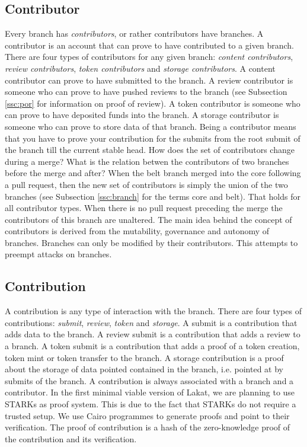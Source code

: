 \documentclass[14pt]{article}
\begin{document}
\subsection{Contributor}
\label{ssc:contributors}
Every branch has \textit{contributors}, or rather contributors have branches. A contributor is an account that can prove to have contributed to a given branch. There are four types of contributors for any given branch: \textit{content contributors}, \textit{review contributors}, \textit{token contributors} and \textit{storage contributors}. A content contributor can prove to have submitted to the branch. A review contributor is someone who can prove to have pushed reviews to the branch (see Subsection \ref{ssc:por} for information on proof of review). A token contributor is someone who can prove to have deposited funds into the branch. A storage contributor is someone who can prove to store data of that branch. Being a contributor means that you have to prove your contribution for the submits from the root submit of the branch till the current stable head.
How does the set of contributors change during a merge? What is the relation betwen the contributors of two branches before the merge and after? When the belt branch merged into the core following a pull request, then the new set of contributors is simply the union of the two branches (see Subsection \ref{ssc:branch} for the terms core and belt). That holds for all contributor types. When there is no pull request preceding the merge the contributors of this branch are unaltered.
The main idea behind the concept of contributors is derived from the mutability, governance and autonomy of branches. Branches can only be modified by their contributors. This attempts to preempt attacks on branches.


\subsection{Contribution}
\label{ssc:contribution}

A contribution is any type of interaction with the branch. There are four types of contributions: \textit{submit}, \textit{review}, \textit{token} and \textit{storage}. A submit is a contribution that adds data to the branch. A review submit is a contribution that adds a review to a branch. A token submit is a contribution that adds a proof of a token creation, token mint or token transfer to the branch. A storage contribution is a proof about the storage of data pointed contained in the branch, i.e. pointed at by submits of the branch. A contribution is always associated with a branch and a contributor. In the first minimal viable version of Lakat, we are planning to use STARKs \cite{} as proof system. This is due to the fact that STARKs do not require a trusted setup. We use Cairo programmes to generate proofs and point to their verification. The proof of contribution is a hash of the zero-knowledge proof of the contribution and its verification.
\end{document}
